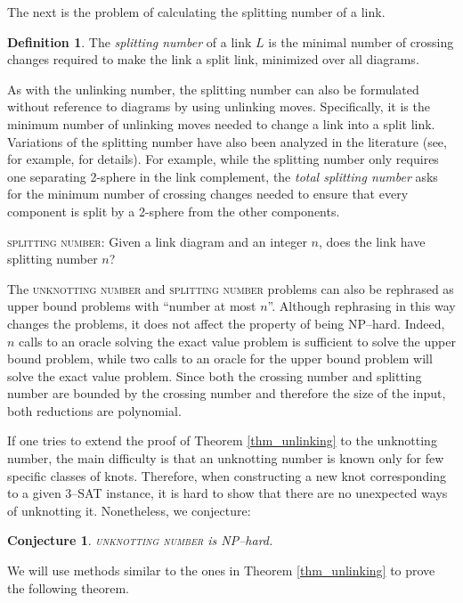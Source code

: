 \documentclass[12pt]{amsart}
\newtheorem{conj}[thm]{Conjecture}
\theoremstyle{definition}
\newtheorem{defn}[thm]{Definition}
\theoremstyle{remark}
\begin{document}
The next is the problem of calculating the splitting number of a link.
\begin{defn}
The \emph{splitting number} of a link $L$ is the minimal number of crossing changes required to make the link a split link, minimized over all diagrams.
\end{defn}
As with the unlinking number, the splitting number can also be formulated without reference to diagrams by using unlinking moves.  Specifically, it is the minimum number of unlinking moves needed to change a link into a split link.  Variations of the splitting number have also been analyzed in the literature (see, for example, \cite{Lackenby3} for details).  For example, while the splitting number only requires one separating 2-sphere in the link complement,  the \emph{total splitting number} asks for the minimum number of crossing changes needed to ensure that every component is split by a 2-sphere from the other components.

\vspace{0.14in}
\textsc{splitting number}: Given a link diagram and an integer $n$, does the link have splitting number $n$?
\vspace{0.14in}

The \textsc{unknotting number} and \textsc{splitting number} problems can also be rephrased as upper bound problems with ``number at most $n$''.  Although rephrasing in this way changes the problems, it does not affect the property of being NP--hard. Indeed, $n$ calls to an oracle solving the exact value problem is sufficient to solve the upper bound problem, while two calls to an oracle for the upper bound problem will solve the exact value problem.  Since both the crossing number and splitting number are bounded by the crossing number and therefore the size of the input, both reductions are polynomial.

If one tries to extend the proof of Theorem \ref{thm_unlinking} to the unknotting number, the main difficulty is that an unknotting number is known only for few specific classes of knots. Therefore, when constructing a new knot corresponding to a given 3--\textsc{SAT} instance, it is hard to show that there are no unexpected ways of unknotting it.  Nonetheless, we conjecture:

\begin{conj} \textsc{unknotting number} is NP--hard.
\end{conj}

We will use methods similar to the ones in Theorem \ref{thm_unlinking} to prove the following theorem.
\end{document}
